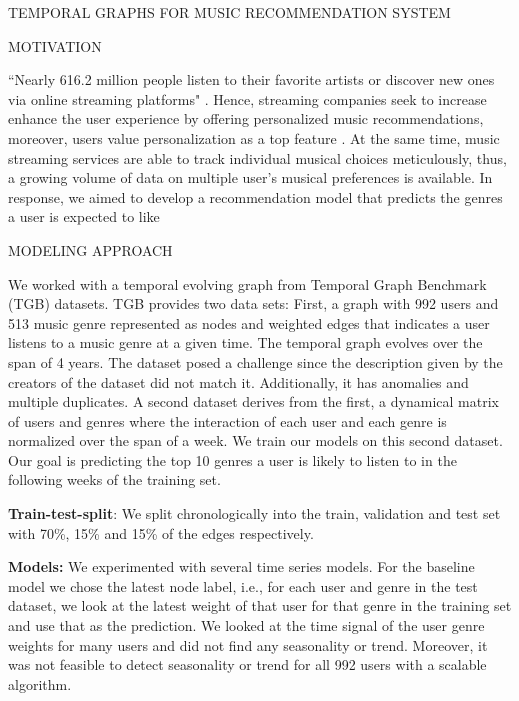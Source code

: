 \documentclass[10pt, letterpaper]{article}
\renewcommand{\title}[1]{%
	\begin{center}
		{\Large \uppercase{#1}}
	\end{center}
}
\renewcommand{\section}[1]{%
	    \vspace{\parskip}
		{\large \uppercase{#1}}
}
\begin{document}
	
\title{Temporal Graphs for Music recommendation system}

\section{Motivation}

``Nearly 616.2 million people listen to their favorite artists or discover new ones via online streaming platforms" \cite{statista}. Hence, streaming companies seek to increase enhance the user experience by offering personalized music recommendations, moreover, users value personalization as a top feature \cite{spotify}. At the same time, music streaming services are able to track individual musical choices meticulously, thus, a growing volume of data on  multiple user's musical preferences is available.
In response, we aimed to develop a recommendation model that predicts the genres a user is expected to like

\section{Modeling approach}

We worked with a temporal evolving graph from Temporal Graph Benchmark (TGB) \cite{H:2023} datasets. TGB provides two data sets: First, a graph with 992 users and 513 music genre represented as nodes and weighted edges that indicates a user listens to a music genre at a given time. The temporal graph evolves over the span of 4 years.  The dataset posed a challenge since the description given by the creators of the dataset did not match it. Additionally, it has anomalies and multiple duplicates. A second dataset derives from the first, a dynamical matrix of users and genres where the interaction of each user and each genre is normalized over the span of a week. We train our models on this second dataset. Our goal is predicting the top 10 genres a user is likely to listen to in the following weeks of the training set.
 
\textbf{Train-test-split}: We split chronologically into the train, validation and test set with 70\%, 15\% and 15\% of the edges respectively. 

\textbf{Models:} We experimented with several time series models. For the baseline model we chose the latest node label, i.e., for each user and genre in the test dataset, we look at the latest weight of that user for that genre in the training set and use that as the prediction. We looked at the time signal of the user genre weights for many users and did not find any seasonality or trend. Moreover, it was not feasible to detect seasonality or trend for all 992 users with a scalable algorithm.
\end{document}
